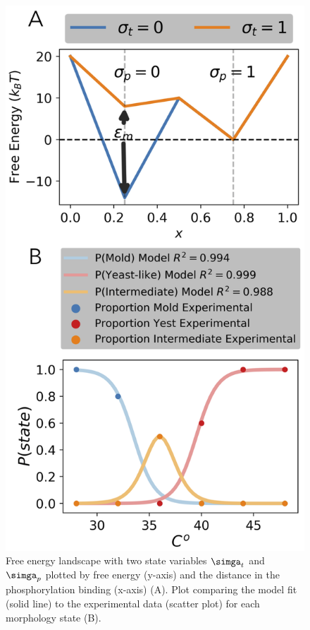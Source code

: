 \documentclass[preprint,12pt]{elsarticle}
\begin{document}
\pagebreak
\begin{figure}[h]
\centering\includegraphics[width=.75\linewidth]{fig1.png}
\caption{Free energy landscape with two state variables $\simga_{t}$ and $\simga_{p}$ plotted by free energy (y-axis) and the distance in the phosphorylation binding (x-axis) (A). Plot comparing the model fit (solid line) to the experimental data (scatter plot) for each morphology state (B).}
\end{figure}
\end{document}

